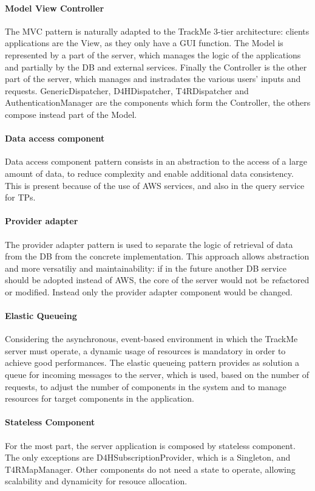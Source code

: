 \paragraph{Model View Controller}
The MVC pattern is naturally adapted to the TrackMe 3-tier architecture: clients applications are the View, as they only have a GUI function. The Model is represented by a part of the server, which manages the logic of the applications and partially by the DB and external services. Finally the Controller is the other part of the server, which manages and instradates the various users' inputs and requests.
GenericDispatcher, D4HDispatcher, T4RDispatcher and AuthenticationManager are the components which form the Controller, the others compose instead part of the Model.

\paragraph{Data access component}
Data access component pattern consists in an abstraction to the access of a large amount of data, to reduce complexity and enable additional data consistency. This is present because of the use of AWS services, and also in the query service for TPs.

\paragraph{Provider adapter}
The provider adapter pattern is used to separate the logic of retrieval of data from the DB from the concrete implementation. This approach allows abstraction and more versatiliy and maintainability: if in the future another DB service should be adopted instead of AWS, the core of the server would not be refactored or modified. Instead only the provider adapter component would be changed.

\paragraph{Elastic Queueing}
Considering the asynchronous, event-based environment in which the TrackMe server must operate, a dynamic usage of resources is mandatory in order to achieve good performances. The elastic queueing pattern provides as solution a queue for incoming messages to the server, which is used, based on the number of requests, to adjust the number of components in the system and to manage resources for target components in the application.

\paragraph{Stateless Component}
For the most part, the server application is composed by stateless component. The only exceptions are D4HSubscriptionProvider, which is a Singleton, and T4RMapManager. Other components do not need a state to operate, allowing scalability and dynamicity for resouce allocation.

